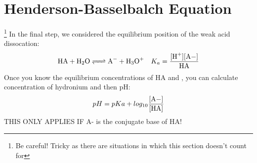 \documentclass{article}  %
\begin{document}
\section*{Henderson-Basselbalch Equation}\footnote{Be careful! Tricky as there are situations in which this section doesn't count for}
In the final step, we considered the equilibrium position of the weak acid dissocation:
\begin{equation*}
    \begin{aligned}
        \ce{HA + H2O <=> A- + H3O+} \quad K_a = \ce{\frac{[H+][A-]}{HA}} 
    \end{aligned}
\end{equation*}
Once you know the equilibrium concentrations of HA and , you can calculate concentration of hydronium and then pH:
\begin{equation*}
    \begin{aligned}
        pH = pKa + log_{10}\ce{\frac{[A-]}{[HA]}}
    \end{aligned}
\end{equation*}
THIS ONLY APPLIES IF A- is the conjugate base of HA!
\end{document}
